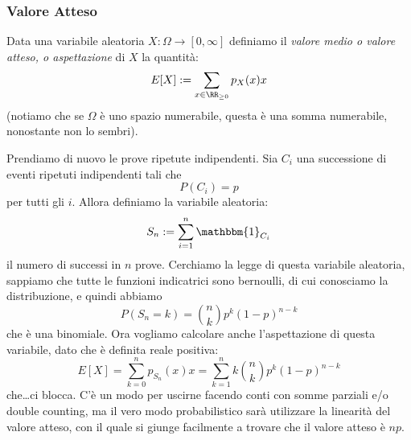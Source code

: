 \documentclass[11pt]{scrartcl}
\begin{document}
	\subsubsection{Valore Atteso}
	\begin{definition}
		Data una variabile aleatoria $X:\Omega\to [0,\infty]$ definiamo il \textit{valore medio o valore atteso, o aspettazione} di $X$ la quantità:
		$$E[X]:=\sum_{x\in \RR_{\ge 0}} p_X(x)x$$
		(notiamo che se $\Omega$ è uno spazio numerabile, questa è una somma numerabile, nonostante non lo sembri).
	\end{definition}
	\begin{example}
		Prendiamo di nuovo le prove ripetute indipendenti. Sia $C_i$ una successione di eventi ripetuti indipendenti tali che
		$$P(C_i)=p$$
		per tutti gli $i$. Allora definiamo la variabile aleatoria:
		$$S_n:=\sum_{i=1}^{n}\mathbbm{1}_{C_i}$$
		il numero di successi in $n$ prove. Cerchiamo la legge di questa variabile aleatoria, sappiamo che tutte le funzioni indicatrici sono bernoulli, di cui conosciamo la distribuzione, e quindi abbiamo 
		$$P(S_n=k)=\binom{n}{k}p^k(1-p)^{n-k}$$
		che è una binomiale. Ora vogliamo calcolare anche l'aspettazione di questa variabile, dato che è definita reale positiva:
		$$E[X]=\sum_{k=0}^{n}p_{S_n}(x)x=\sum_{k=1}^{n}k \binom{n}{k}p^{k}(1-p)^{n-k}$$
		che\dots ci blocca. C'è un modo per uscirne facendo conti con somme parziali e/o double counting, ma il vero modo probabilistico sarà utilizzare la linearità del valore atteso, con il quale si giunge facilmente a trovare che il valore atteso è $np$.
	\end{example}
\end{document}
